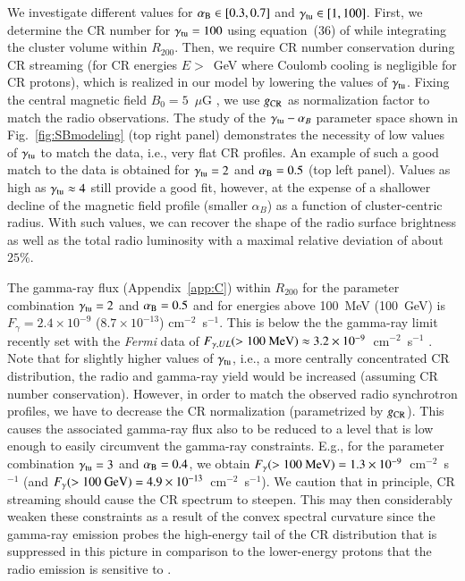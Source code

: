 \documentclass[useAMS,usenatbib]{mn2e}
\begin{document}
We investigate different values for $\alpha_{{\mathrm{B}}}\in [0.3,0.7]$ and
$\gamma_{{\mathrm{tu}}}\in [1,100]$. First, we determine the CR number for
$\gamma_{{\mathrm{tu}}}=100$ using equation~(36) of \cite{2011A&A...527A..99E} while
integrating the cluster volume within $R_{200}$. Then, we require CR number
conservation during CR streaming (for CR energies $E>$~GeV where Coulomb cooling
is negligible for CR protons), which is realized in our model by lowering the
values of $\gamma_{{\mathrm{tu}}}$. Fixing the central magnetic field
$B_{0}=5$~$\mu$G \citep{2010A&A...513A..30B}, we use $g_{{\mathrm{CR}}}$ as
normalization factor to match the radio observations.  The study of the
$\gamma_{{\mathrm{tu}}}-\alpha_{B}$ parameter space shown in
Fig.~\ref{fig:SBmodeling} (top right panel) demonstrates the necessity of low
values of $\gamma_{{\mathrm{tu}}}$ to match the data, i.e., very flat CR profiles. An
example of such a good match to the data is obtained for $\gamma_{{\mathrm{tu}}}=2$
and $\alpha_{{\mathrm{B}}}=0.5$ (top left panel). Values as high as
$\gamma_{{\mathrm{tu}}} \approx 4$ still provide a good fit, however, at the expense
of a shallower decline of the magnetic field profile (smaller $\alpha_B$) as a
function of cluster-centric radius. With such values, we can recover the shape
of the radio surface brightness as well as the total radio luminosity with a
maximal relative deviation of about $25\%$.

The gamma-ray flux (Appendix~\ref{app:C}) within $R_{200}$ for the parameter
combination $\gamma_{{\mathrm{tu}}} = 2$ and $\alpha_{{\mathrm{B}}}=0.5$ and for energies
above 100~MeV (100~GeV) is $F_{\gamma} = 2.4 \times 10^{-9}$ ($8.7 \times
10^{-13}$) cm$^{-2}$~s$^{-1}$. This is below the the gamma-ray limit recently
set with the \emph{Fermi} data of $F_{\gamma, UL} (>100~{\mathrm{MeV}}) \approx 3.2
\times 10^{-9}$~cm$^{-2}$~s$^{-1}$ \citep{2012...VERITAS}.  Note that for
slightly higher values of $\gamma_{{\mathrm{tu}}}$, i.e., a more centrally
concentrated CR distribution, the radio and gamma-ray yield would be increased
(assuming CR number conservation). However, in order to match the observed radio
synchrotron profiles, we have to decrease the CR normalization (parametrized by
$g_{{\mathrm{CR}}}$). This causes the associated gamma-ray flux also to be reduced to
a level that is low enough to easily circumvent the gamma-ray constraints. E.g.,
for the parameter combination $\gamma_{{\mathrm{tu}}} = 3$ and
$\alpha_{{\mathrm{B}}}=0.4$, we obtain $F_{\gamma} (>100~{\mathrm{MeV}}) = 1.3 \times
10^{-9}$~cm$^{-2}$~s$^{-1}$ (and $F_{\gamma} (>100~{\mathrm{GeV}}) = 4.9 \times
10^{-13}$~cm$^{-2}$~s$^{-1}$).  We caution that in principle, CR streaming
should cause the CR spectrum to steepen.  This may then considerably weaken
these constraints as a result of the convex spectral curvature since the
gamma-ray emission probes the high-energy tail of the CR distribution that is
suppressed in this picture in comparison to the lower-energy protons that the
radio emission is sensitive to \citep[see][for an extended discussion of this
point]{2011arXiv1111.5544M}.
\end{document}
